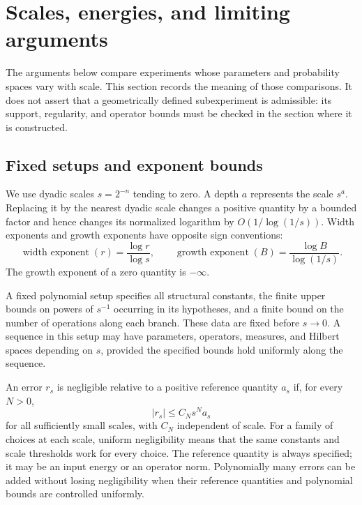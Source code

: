 \section{Scales, energies, and limiting arguments}
\label{sec:framework}

The arguments below compare experiments whose parameters and probability
spaces vary with scale.  This section records the meaning of those
comparisons.  It does not assert that a geometrically defined
subexperiment is admissible: its support, regularity, and operator bounds
must be checked in the section where it is constructed.

\subsection{Fixed setups and exponent bounds}

We use dyadic scales $s=2^{-n}$ tending to zero.  A depth $a$ represents
the scale $s^a$.  Replacing it by the nearest dyadic scale changes a
positive quantity by a bounded factor and hence changes its normalized
logarithm by $O(1/\log(1/s))$.  Width exponents and growth exponents have
opposite sign conventions:
\[
 \operatorname{width\ exponent}(r)=\frac{\log r}{\log s},
 \qquad
 \operatorname{growth\ exponent}(B)=\frac{\log B}{\log(1/s)}.
\]
The growth exponent of a zero quantity is $-\infty$.

\begin{definition}\label{def:fw-setup}
A fixed polynomial setup specifies all structural constants, the finite
upper bounds on powers of $s^{-1}$ occurring in its hypotheses, and a
finite bound on the number of operations along each branch.  These data
are fixed before $s\to0$.  A sequence in this setup may have parameters,
operators, measures, and Hilbert spaces depending on $s$, provided the
specified bounds hold uniformly along the sequence.

An error $r_s$ is negligible relative to a positive reference quantity
$a_s$ if, for every $N>0$,
\[
 |r_s|\le C_N s^N a_s
\]
for all sufficiently small scales, with $C_N$ independent of scale.
For a family of choices at each scale, uniform negligibility means that
the same constants and scale thresholds work for every choice.  The
reference quantity is always specified; it may be an input energy or
an operator norm.  Polynomially many errors can be added without losing
negligibility when their reference quantities and polynomial bounds
are controlled uniformly.
\end{definition}

